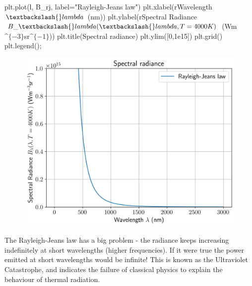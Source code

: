 \documentclass[
  letterpaper,
  DIV=11,
  numbers=noendperiod]{scrartcl}
\newenvironment{Shaded}{\begin{snugshade}}{\end{snugshade}}
\newcommand{\DecValTok}[1]{\textcolor[rgb]{0.68,0.00,0.00}{#1}}
\newcommand{\FloatTok}[1]{\textcolor[rgb]{0.68,0.00,0.00}{#1}}
\newcommand{\NormalTok}[1]{\textcolor[rgb]{0.00,0.23,0.31}{#1}}
\newcommand{\OperatorTok}[1]{\textcolor[rgb]{0.37,0.37,0.37}{#1}}
\newcommand{\StringTok}[1]{\textcolor[rgb]{0.13,0.47,0.30}{#1}}
\newcommand{\VerbatimStringTok}[1]{\textcolor[rgb]{0.13,0.47,0.30}{#1}}
\begin{document}
\begin{Shaded}
\begin{Highlighting}[]
\NormalTok{plt.plot(l, B\_rj, label}\OperatorTok{=}\StringTok{"Rayleigh{-}Jeans law"}\NormalTok{)}
\NormalTok{plt.xlabel(}\VerbatimStringTok{r\textquotesingle{}Wavelength $\textbackslash{}lambda$ (nm)\textquotesingle{}}\NormalTok{)}
\NormalTok{plt.ylabel(}\VerbatimStringTok{r\textquotesingle{}Spectral Radiance $B\_\textbackslash{}lambda(\textbackslash{}lambda, T=4000K)$ (Wm$\^{}\{{-}3\}$sr$\^{}\{{-}1\}$)\textquotesingle{}}\NormalTok{)}
\NormalTok{plt.title(}\StringTok{\textquotesingle{}Spectral radiance\textquotesingle{}}\NormalTok{)}
\NormalTok{plt.ylim([}\DecValTok{0}\NormalTok{,}\FloatTok{1e15}\NormalTok{])}
\NormalTok{plt.grid()}
\NormalTok{plt.legend()}\OperatorTok{;}
\end{Highlighting}
\end{Shaded}

\begin{figure}[H]

{\centering \includegraphics{SP1.1_-_Stellar_Properties_files/figure-pdf/cell-18-output-1.png}

}

\end{figure}

The Rayleigh-Jeans law has a big problem - the radiance keeps increasing
indefinitely at short wavelengths (higher frequencies). If it were true
the power emitted at short wavelengths would be infinite! This is known
as the Ultraviolet Catastrophe, and indicates the failure of classical
physics to explain the behaviour of thermal radiation.
\end{document}
